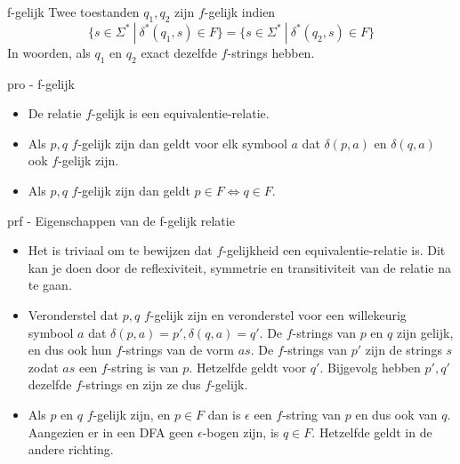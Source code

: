 \begin{theo}[$f$-gelijk]{f-gelijk}
    Twee toestanden \(q_1,q_2\) zijn $f$-gelijk indien
    \begin{equation*}
        \{ s \in \Sigma^* \ | \ \delta^*(q_1,s) \in F\} = \{s \in \Sigma^* \ | \ \delta^*(q_2,s) \in F\}
    \end{equation*}
    In woorden, als $q_1$ en $q_2$ exact dezelfde $f$-strings hebben.
\end{theo}

\begin{pro}[$f$-gelijk]{pro - f-gelijk}
    \begin{itemize}
        \item De relatie $f$-gelijk is een equivalentie-relatie.
        \item Als $p,q$ $f$-gelijk zijn dan geldt voor elk symbool $a$ dat \(\delta(p,a)\) en \(\delta(q,a)\) ook $f$-gelijk zijn.
        \item Als $p,q$ $f$-gelijk zijn dan geldt \(p \in F \Leftrightarrow q \in F\).
    \end{itemize}
\end{pro}

\begin{prf}{prf - Eigenschappen van de f-gelijk relatie}
    \begin{itemize}
        \item Het is triviaal om te bewijzen dat $f$-gelijkheid een equivalentie-relatie is. Dit kan je doen door de reflexiviteit, symmetrie en transitiviteit van de relatie na te gaan.
        \item Veronderstel dat $p,q$ $f$-gelijk zijn en veronderstel voor een willekeurig symbool $a$ dat \(\delta(p,a) = p', \delta(q,a) = q'\). De $f$-strings van $p$ en $q$ zijn gelijk,
              en dus ook hun $f$-strings van de vorm $as$. De $f$-strings van $p'$ zijn de strings $s$ zodat $as$ een $f$-string is van $p$.
              Hetzelfde geldt voor $q'$. Bijgevolg hebben $p',q'$ dezelfde $f$-strings en zijn ze dus $f$-gelijk.
        \item Als $p$ en $q$ $f$-gelijk zijn, en $p \in F$ dan is $\epsilon$ een $f$-string van $p$ en dus ook van $q$. Aangezien er in een DFA geen $\epsilon$-bogen zijn, is $q \in F$.
              Hetzelfde geldt in de andere richting. 
    \end{itemize}
    \vspace{-0.5cm}
\end{prf}

